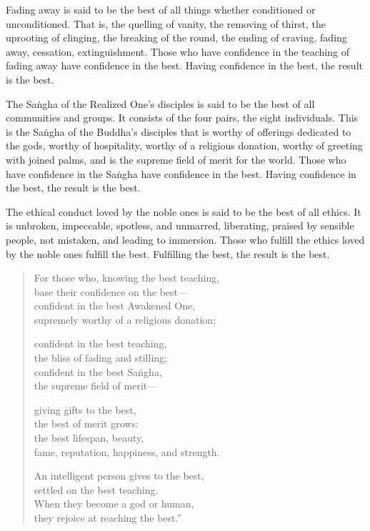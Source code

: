 \documentclass[12pt,openany]{book}%
\begin{document}
Fading away is said to be the best of all things whether conditioned or unconditioned. That is, the quelling of vanity, the removing of thirst, the uprooting of clinging, the breaking of the round, the ending of craving, fading away, cessation, extinguishment. Those who have confidence in the teaching of fading away have confidence in the best. Having confidence in the best, the result is the best. 

The \textsanskrit{Saṅgha} of the Realized One’s disciples is said to be the best of all communities and groups. It consists of the four pairs, the eight individuals. This is the \textsanskrit{Saṅgha} of the Buddha’s disciples that is worthy of offerings dedicated to the gods, worthy of hospitality, worthy of a religious donation, worthy of greeting with joined palms, and is the supreme field of merit for the world. Those who have confidence in the \textsanskrit{Saṅgha} have confidence in the best. Having confidence in the best, the result is the best. 

The ethical conduct loved by the noble ones is said to be the best of all ethics. It is unbroken, impeccable, spotless, and unmarred, liberating, praised by sensible people, not mistaken, and leading to immersion. Those who fulfill the ethics loved by the noble ones fulfill the best. Fulfilling the best, the result is the best. 

\begin{verse}%
For those who, knowing the best teaching, \\
base their confidence on the best—\\
confident in the best Awakened One, \\
supremely worthy of a religious donation; 

confident in the best teaching, \\
the bliss of fading and stilling; \\
confident in the best \textsanskrit{Saṅgha}, \\
the supreme field of merit—

giving gifts to the best, \\
the best of merit grows: \\
the best lifespan, beauty, \\
fame, reputation, happiness, and strength. 

An intelligent person gives to the best, \\
settled on the best teaching. \\
When they become a god or human, \\
they rejoice at reaching the best.” 

%
\end{verse}
\end{document}
